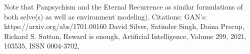 \documentclass{article}
\begin{document}
Note that Panpsychism and the Eternal Recurrence as similar formulations of both selve(s) as well as environment modeling).
Citations: 
GAN's: https://arxiv.org/abs/1701.00160
David Silver, Satinder Singh, Doina Precup, Richard S. Sutton, Reward is enough, Artificial Intelligence, Volume 299, 2021, 103535, ISSN 0004-3702,
\end{document}
